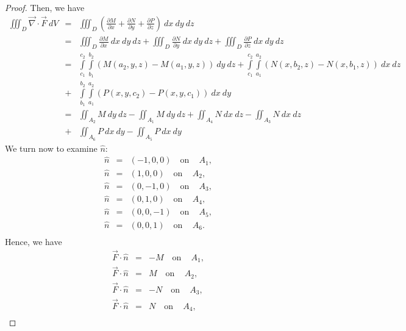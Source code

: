 \begin{proof}
Then, we have
\begin{eqnarray*}
\displaystyle \iiint_D \vec{\nabla} \cdot \vec F \ dV&=&\displaystyle \iiint_D \left({ \frac{\partial M}{\partial x} + \frac{\partial N}{\partial y} + \frac{\partial P}{\partial z} }\right) \ dx \ dy \ dz\\[0.2cm]
&=&\displaystyle \iiint_D \frac{\partial M}{\partial x} \ dx \ dy \ dz + \iiint_D \frac{\partial N}{\partial y} \ dx \ dy \ dz + \iiint_D \frac{\partial P}{\partial z} \ dx \ dy \ dz\\[0.2cm]
&=&\displaystyle \int\limits_{c_1}^{c_2} \int\limits_{b_1}^{b_2} \left({M \left({a_2, y, z}\right) - M \left({a_1, y, z}\right)}\right) \ dy \ dz +\displaystyle \int\limits_{c_1}^{c_2} \int\limits_{a_1}^{a_2} \left({N \left({x, b_2, z}\right) - N \left({x, b_1, z}\right)}\right) \ dx \ dz\\[0.2cm]
&+&\displaystyle \int\limits_{b_1}^{b_2} \int\limits_{a_1}^{a_2} \left({P \left({x, y, c_2}\right) - P \left({x, y, c_1}\right)}\right) \ dx \ dy\\[0.2cm]
&=&\displaystyle \iint_{A_2} M \ dy \ dz - \iint_{A_1} M \ dy \ dz+\displaystyle \iint_{A_4} N \ dx \ dz - \iint_{A_3} N \ dx \ dz\\[0.2cm]
&+&\displaystyle \iint_{A_6} P \ dx \ dy - \iint_{A_5} P \ dx \ dy
\end{eqnarray*}
We turn now to examine $\hat{n}$:
\begin{eqnarray*}
\hat{n}&=&\displaystyle \left({-1, 0, 0}\right)\quad\text{on}\quad\,A_1,\\
\hat{n}&=&\displaystyle \left({1, 0, 0}\right)\quad\text{on}\quad\,A_2,\\
\hat{n}&=&\displaystyle \left({0, -1, 0}\right)\quad\text{on}\quad\,A_3,\\
\hat{n}&=&\displaystyle \left({0, 1, 0}\right)\quad\text{on}\quad\,A_4,\\
\hat{n}&=&\displaystyle \left({0, 0, -1}\right)\quad\text{on}\quad\,A_5,\\
\hat{n}&=&\displaystyle \left({0, 0, 1}\right)\quad\text{on}\quad\,A_6.\\
\end{eqnarray*} 
Hence, we have
\begin{eqnarray*}
\vec{F}\cdot\hat{n}&=&-M\quad\text{on}\quad\,A_1,\\
\vec{F}\cdot\hat{n}&=&M\quad\text{on}\quad\,A_2,\\
\vec{F}\cdot\hat{n}&=&-N\quad\text{on}\quad\,A_3,\\
\vec{F}\cdot\hat{n}&=&N\quad\text{on}\quad\,A_4,\\

\end{eqnarray*}
\end{proof}
